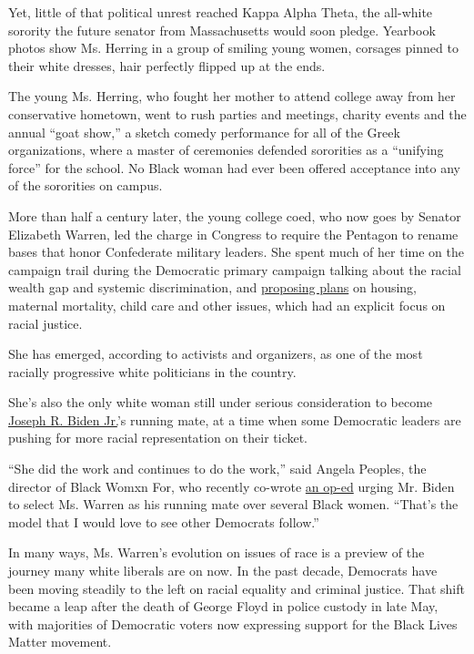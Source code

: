 Yet, little of that political unrest reached Kappa Alpha Theta, the
all-white sorority the future senator from Massachusetts would soon
pledge. Yearbook photos show Ms. Herring in a group of smiling young
women, corsages pinned to their white dresses, hair perfectly flipped up
at the ends.

The young Ms. Herring, who fought her mother to attend college away from
her conservative hometown, went to rush parties and meetings, charity
events and the annual ``goat show,'' a sketch comedy performance for all
of the Greek organizations, where a master of ceremonies defended
sororities as a ``unifying force'' for the school. No Black woman had
ever been offered acceptance into any of the sororities on campus.

More than half a century later, the young college coed, who now goes by
Senator Elizabeth Warren, led the charge in Congress to require the
Pentagon to rename bases that honor Confederate military leaders. She
spent much of her time on the campaign trail during the Democratic
primary campaign talking about the racial wealth gap and systemic
discrimination, and
\href{https://www.nytimes3xbfgragh.onion/2019/06/10/us/politics/elizabeth-warren-2020-policies-platform.html}{proposing
plans} on housing, maternal mortality, child care and other issues,
which had an explicit focus on racial justice.

She has emerged, according to activists and organizers, as one of the
most racially progressive white politicians in the country.

She's also the only white woman still under serious consideration to
become
\href{https://www.nytimes3xbfgragh.onion/interactive/2020/us/elections/joe-biden.html}{Joseph
R. Biden Jr.}'s running mate, at a time when some Democratic leaders are
pushing for more racial representation on their ticket.

``She did the work and continues to do the work,'' said Angela Peoples,
the director of Black Womxn For, who recently co-wrote
\href{https://www.washingtonpost.com/outlook/2020/07/15/biden-black-women-warren-running-mate/}{an
op-ed} urging Mr. Biden to select Ms. Warren as his running mate over
several Black women. ``That's the model that I would love to see other
Democrats follow.''

In many ways, Ms. Warren's evolution on issues of race is a preview of
the journey many white liberals are on now. In the past decade,
Democrats have been moving steadily to the left on racial equality and
criminal justice. That shift became a leap after the death of George
Floyd in police custody in late May, with majorities of Democratic
voters now expressing support for the Black Lives Matter movement.

